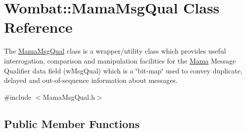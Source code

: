 \hypertarget{classWombat_1_1MamaMsgQual}{
\section{Wombat::MamaMsgQual Class Reference}
\label{classWombat_1_1MamaMsgQual}
}


The \hyperlink{classWombat_1_1MamaMsgQual}{MamaMsgQual} class is a wrapper/utility class which provides useful interrogation, comparison and manipulation facilities for the \hyperlink{classWombat_1_1Mama}{Mama} Message Qualifier data field (wMsgQual) which is a \char`\"{}bit-\/map\char`\"{} used to convey duplicate, delayed and out-\/of-\/sequence information about messages.  


{\ttfamily \#include $<$MamaMsgQual.h$>$}\subsection*{Public Member Functions}

